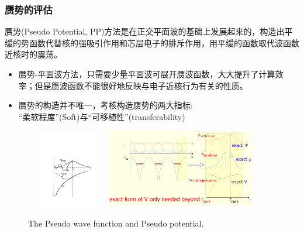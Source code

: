 \frame
{
\frametitle{赝势的评估}
赝势(\textrm{Pseudo Potential, PP})方法是在正交平面波的基础上发展起来的，构造出平缓的势函数代替核的强吸引作用和芯层电子的排斥作用，用平缓的函数取代波函数近核时的震荡。
\begin{itemize}
\setlength{\itemsep}{5pt}
	\item 赝势-平面波方法，只需要少量平面波可展开赝波函数，大大提升了计算效率；但是赝波函数不能很好地反映与电子近核行为有关的性质。
	\item 赝势的构造并不唯一，考核构造赝势的两大指标:~\\“柔软程度”\textrm{(Soft)}与“可移植性”\textrm{(transferability)}
\end{itemize}
\begin{figure}[h!]
\centering
\vspace*{-0.10in}
\includegraphics[height=1.35in,width=1.40in,viewport=154 100 562 508,clip]{Figures/Pseudo.pdf}
\includegraphics[height=1.35in,width=2.55in,viewport=1 1 980 500,clip]{Figures/Pseudo-2.png}
\caption{\tiny \textrm{The Pseudo wave function and Pseudo potential.}}%
\label{Pseudo_Potential-Wave}
\end{figure}
}

